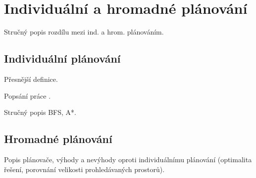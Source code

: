 \section{Individuální a hromadné plánování}\label{sec:individualni_a_hromadne_planovani}

Stručný popis rozdílu mezi ind. a hrom. plánováním.

\subsection{Individuální plánování}\label{subsec:individualni_planovani}

Přesnější definice.

Popsání práce \citet{Dresner}.

Stručný popis BFS, A*.

%
%
%
%
%
\subsection{Hromadné plánování}\label{subsec:hromadne_planovani}

Popis plánovače, výhody a nevýhody oproti individuálnímu plánování
(optimalita řešení, porovnání velikosti prohledávaných prostorů).

%
%
%


